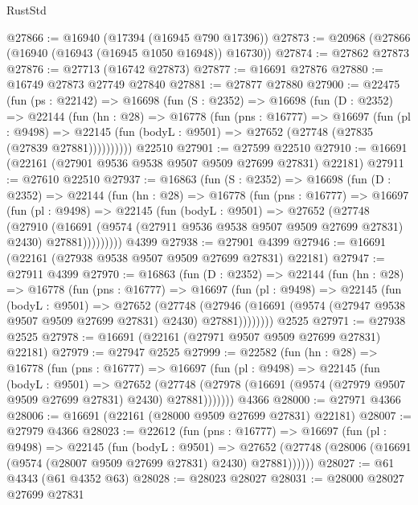 \begin{lexlean}{RustStd}
\begin{coremodule}
@27866 := @16940 (@17394 (@16945 @790 @17396))
@27873 := @20968 (@27866 (@16940 (@16943 (@16945 @1050 @16948)) @16730))
@27874 := @27862 @27873
@27876 := @27713 (@16742 @27873)
@27877 := @16691 @27876
@27880 := @16749 @27873 @27749 @27840
@27881 := @27877 @27880
@27900 := @22475
    (fun (ps : @22142) =>
    @16698
      (fun (S : @2352) =>
      @16698
        (fun (D : @2352) =>
        @22144
          (fun (hn : @28) =>
          @16778
            (fun (pns : @16777) =>
            @16697
              (fun (pl : @9498) =>
              @22145 (fun (bodyL : @9501) => @27652 (@27748 (@27835 (@27839 @27881))))))))))
    @22510
@27901 := @27599 @22510
@27910 := @16691 (@22161 (@27901 @9536 @9538 @9507 @9509 @27699 @27831) @22181)
@27911 := @27610 @22510
@27937 := @16863
    (fun (S : @2352) =>
    @16698
      (fun (D : @2352) =>
      @22144
        (fun (hn : @28) =>
        @16778
          (fun (pns : @16777) =>
          @16697
            (fun (pl : @9498) =>
            @22145
              (fun (bodyL : @9501) =>
              @27652
                (@27748
                  (@27910
                    (@16691
                      (@9574 (@27911 @9536 @9538 @9507 @9509 @27699 @27831) @2430)
                      @27881)))))))))
    @4399
@27938 := @27901 @4399
@27946 := @16691 (@22161 (@27938 @9538 @9507 @9509 @27699 @27831) @22181)
@27947 := @27911 @4399
@27970 := @16863
    (fun (D : @2352) =>
    @22144
      (fun (hn : @28) =>
      @16778
        (fun (pns : @16777) =>
        @16697
          (fun (pl : @9498) =>
          @22145
            (fun (bodyL : @9501) =>
            @27652
              (@27748
                (@27946
                  (@16691 (@9574 (@27947 @9538 @9507 @9509 @27699 @27831) @2430) @27881))))))))
    @2525
@27971 := @27938 @2525
@27978 := @16691 (@22161 (@27971 @9507 @9509 @27699 @27831) @22181)
@27979 := @27947 @2525
@27999 := @22582
    (fun (hn : @28) =>
    @16778
      (fun (pns : @16777) =>
      @16697
        (fun (pl : @9498) =>
        @22145
          (fun (bodyL : @9501) =>
          @27652
            (@27748 (@27978 (@16691 (@9574 (@27979 @9507 @9509 @27699 @27831) @2430) @27881)))))))
    @4366
@28000 := @27971 @4366
@28006 := @16691 (@22161 (@28000 @9509 @27699 @27831) @22181)
@28007 := @27979 @4366
@28023 := @22612
    (fun (pns : @16777) =>
    @16697
      (fun (pl : @9498) =>
      @22145
        (fun (bodyL : @9501) =>
        @27652 (@27748 (@28006 (@16691 (@9574 (@28007 @9509 @27699 @27831) @2430) @27881))))))
@28027 := @61 @4343 (@61 @4352 @63)
@28028 := @28023 @28027
@28031 := @28000 @28027 @27699 @27831

\end{coremodule}
\end{lexlean}
